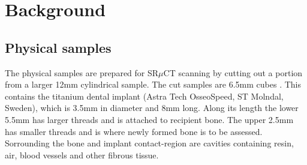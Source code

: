 \section{Background}
\label{sec:background}

\subsection{Physical samples}

The physical samples are prepared for SR$\mu$CT scanning by cutting out a portion from a larger
12mm cylindrical sample.  The cut samples are 6.5mm cubes . This
contains the titanium dental implant (Astra Tech OsseoSpeed, ST Molndal, Sweden), which is 3.5mm
in diameter and 8mm long. Along its length the lower 5.5mm has larger threads and is attached to
recipient bone. The upper 2.5mm has smaller threads and is where newly formed bone is to be
assessed. Sorrounding the bone and implant contact-region are cavities containing resin, air,
blood vessels and other fibrous tissue.

